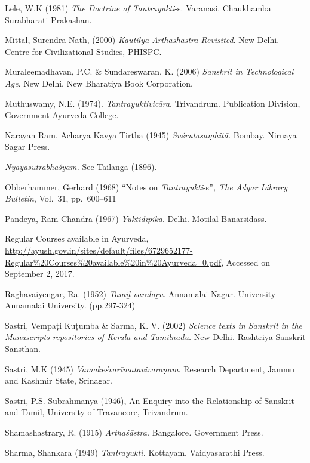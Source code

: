 \begin{thebibliography}{99}
  Lele, W.K (1981) \textit{The Doctrine of Tantrayukti}-s. Varanasi. Chaukhamba Surabharati Prakashan.

  Mittal, Surendra Nath, (2000) \textit{Kautilya Arthashastra Revisited}. New Delhi. Centre for Civilizational Studies, PHISPC.

  Muraleemadhavan, P.C. \& Sundareswaran, K. (2006) \textit{Sanskrit in Technological Age}. New Delhi. New Bharatiya Book Corporation.

  Muthuswamy, N.E. (1974). \textit{Tantrayuktivicāra}. Trivandrum. Publication Division, Government Ayurveda College.

  Narayan Ram, Acharya Kavya Tirtha (1945) \textit{Suśrutasaṃhitā.} Bombay. Nirnaya Sagar Press.

  \textit{Nyāyasūtrabhāśyam.} See Tailanga (1896).

  Obberhammer, Gerhard (1968) “Notes on \textit{Tantrayukti}-s”\textit{, The Adyar Library Bulletin}, Vol.~31, pp.~600--611

  Pandeya, Ram Chandra (1967) \textit{Yuktidīpikā}. Delhi. Motilal Banarsidass.

  Regular Courses available in Ayurveda, \url{http://ayush.gov.in/sites/default/files/6729652177-Regular%20Courses%20available%20in%20Ayurveda_0.pdf}, Accessed on September 2, 2017.

  Raghavaiyengar, Ra. (1952) \textit{Tamiḻ varalāṟu}. Annamalai Nagar. University Annamalai University. (pp.297-324)

  Sastri, Vempaṭi Kuṭumba \& Sarma, K. V. (2002) \textit{Science texts in Sanskrit in the Manuscripts repositories of Kerala and Tamilnadu. } New Delhi\textit{.} Rashtriya Sanskrit Sansthan.

  Sastri, M.K (1945) \textit{Vamakeśvarīmatavivaraṇam}. Research Department, Jammu and Kashmir State, Srinagar.

  Sastri, P.S. Subrahmanya (1946), An Enquiry into the Relationship of Sanskrit and Tamil, University of Travancore, Trivandrum.

  Shamashastrary, R. (1915) \textit{Arthaśāstra. } Bangalore\textit{.} Government Press.

  Sharma, Shankara (1949) \textit{Tantrayukti.} Kottayam. Vaidyasarathi Press.


\end{thebibliography}
